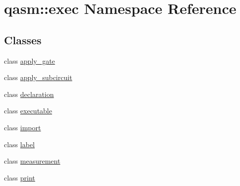 \hypertarget{namespaceqasm_1_1exec}{}\section{qasm\+:\+:exec Namespace Reference}
\label{namespaceqasm_1_1exec}
\subsection*{Classes}
\begin{DoxyCompactItemize}
\item 
class \hyperlink{classqasm_1_1exec_1_1apply__gate}{apply\+\_\+gate}
\item 
class \hyperlink{classqasm_1_1exec_1_1apply__subcircuit}{apply\+\_\+subcircuit}
\item 
class \hyperlink{classqasm_1_1exec_1_1declaration}{declaration}
\item 
class \hyperlink{classqasm_1_1exec_1_1executable}{executable}
\item 
class \hyperlink{classqasm_1_1exec_1_1import}{import}
\item 
class \hyperlink{classqasm_1_1exec_1_1label}{label}
\item 
class \hyperlink{classqasm_1_1exec_1_1measurement}{measurement}
\item 
class \hyperlink{classqasm_1_1exec_1_1print}{print}
\end{DoxyCompactItemize}
